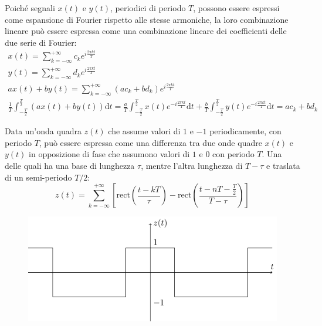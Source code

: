 \documentclass{article}
\newcommand{\rect}{\mathrm{rect}}
\newcommand{\df}{\mathrm{d}}
\numberwithin{equation}{subsection}
\begin{document}
Poiché segnali $x(t)$ e $y(t)$, periodici di periodo $T$, possono essere espressi come espansione di Fourier rispetto alle stesse armoniche, la loro combinazione lineare 
può essere espressa come una combinazione lineare dei coefficienti delle due serie di Fourier:
\begin{gather*}
    x(t)=\displaystyle\sum_{k=-\infty}^{+\infty}c_ke^{i\frac{2\pi  k t}{T}}\\    
    y(t)=\displaystyle\sum_{k=-\infty}^{+\infty}d_ke^{i\frac{2\pi  k t}{T}}\\
    ax(t)+by(t)=\displaystyle\sum_{k=-\infty}^{+\infty}(ac_k+bd_k)e^{i\frac{2\pi  k t}{T}}\\
    \displaystyle\frac{1}{T}\int_{-\frac{T}{2}}^{\frac{T}{2}}(ax(t)+by(t))\df t=\frac{a}{T}\int_{-\frac{T}{2}}^{\frac{T}{2}}x(t)e^{-i\frac{2\pi  k t}{T}}\df t
    +\frac{b}{T}\int_{-\frac{T}{2}}^{\frac{T}{2}}y(t)e^{-i\frac{2\pi  k t}{T}}\df t=ac_k+bd_k
\end{gather*}

Data un'onda quadra $z(t)$ che assume valori di $1$ e $-1$ periodicamente, con periodo $T$, può essere espressa come una differenza tra due onde quadre $x(t)$ e $y(t)$ in 
opposizione di fase che assumono valori di $1$ e $0$ con periodo $T$. Una delle quali ha una base di lunghezza $\tau$, mentre l'altra lunghezza di $T-\tau$ e traslata di un 
semi-periodo $T/2$:
\begin{equation*}
    z(t)=\displaystyle\sum_{k=-\infty}^{+\infty}\left[\rect\left(\frac{t-kT}{\tau}\right)-\rect\left(\frac{t-nT-\frac{T}{2}}{T-\tau}\right)\right]
\end{equation*}

\begin{figure}[H]%
    \centering
    \includegraphics{onda-quadra-2.pdf}%
\end{figure}
\end{document}
